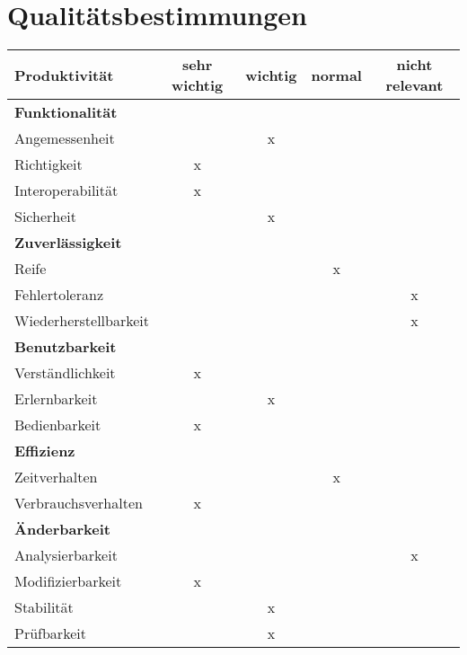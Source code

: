 \documentclass[parskip=full,11pt]{scrartcl}
\begin{document}
	
\section{Qualitätsbestimmungen}

\renewcommand{\arraystretch}{1.5}
\begin{table}[H]
  \begin{center}
    \begin{tabularx}{\textwidth}{X c c c c}
      \hline
      
      \textbf{{\large Produktivität}} & \textbf{{\large sehr wichtig}} & \textbf{{\large wichtig}} & \textbf{{\large normal} } &\textbf{{\large nicht relevant }}\\
      
      \hline      
      \multicolumn{5}{l}{\textbf{Funktionalität}}\\      
      \hline      
      Angemessenheit &   & x &   &  \\
	  Richtigkeit & x &   &   &  \\
	  Interoperabilität & x &   &   &  \\
      Sicherheit &   & x &   &  \\	
		    
	  \hline	  
      \multicolumn{5}{l}{\textbf{Zuverlässigkeit}}\\     
      \hline
      Reife &   &   & x &  \\
	  Fehlertoleranz &   &   &   & x\\
	  Wiederherstellbarkeit &   &   &   & x\\
		
	  \hline	  	
	  \multicolumn{5}{l}{\textbf{Benutzbarkeit}}\\
      \hline
      Verständlichkeit & x &   &   &  \\
	  Erlernbarkeit &   & x &   &  \\
	  Bedienbarkeit & x &   &   &  \\
	  
	  \hline	  	
	  \multicolumn{5}{l}{\textbf{Effizienz}}\\
      \hline
      Zeitverhalten &   &   & x &  \\
	  Verbrauchsverhalten & x &   &   &  \\	
	  
	  \hline	  	
	  \multicolumn{5}{l}{\textbf{Änderbarkeit}}\\
      \hline
      Analysierbarkeit &   &   &   & x\\
	  Modifizierbarkeit & x &   &   &  \\
	  Stabilität &   & x &   &  \\
	  Prüfbarkeit &  & x &  & \\


\end{tabularx}
\end{center}
\end{table}
\end{document}
